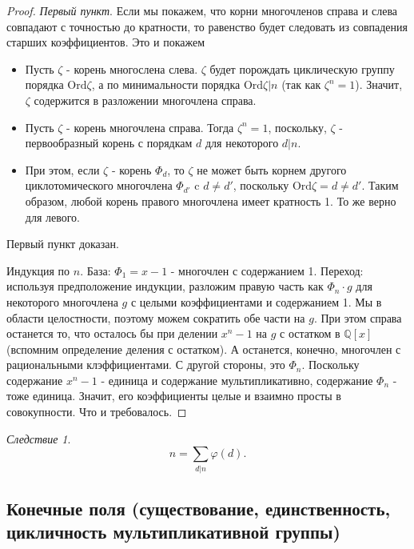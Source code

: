\documentclass[a4paper,100pt]{article}
\theoremstyle{indented}
\theoremstyle{definition}
\theoremstyle{remark}
\newtheorem{cons}{Следствие}
\begin{document}
\begin{proof}
    \textit{Первый пункт}. Если мы покажем, что корни многочленов справа и слева совпадают с точностью до кратности, то равенство будет следовать из совпадения старших коэффициентов. Это и покажем\ 

    \begin{itemize}
        \item Пусть $\zeta$ - корень многослена слева. $\zeta$ будет порождать циклическую группу порядка $\text{Ord} \zeta$, а по минимальности порядка $\text{Ord}\zeta\vert n$ (так как $\zeta^n=1$). Значит, $\zeta$ содержится в разложении многочлена справа.
        \item Пусть $\zeta$ - корень многочлена справа. Тогда $\zeta^n=1$, поскольку, $\zeta$ - первообразный корень с порядкам $d$ для некоторого $d\vert n$.
        \item При этом, если $\zeta$ - корень $\Phi_d$, то $\zeta$ не может быть корнем другого циклотомического многочлена $\Phi_{d'}$ c $d\neq d'$, поскольку $\text{Ord}\zeta=d\neq d'$. Таким образом, любой корень правого многочлена имеет кратность 1. То же верно для левого.
    \end{itemize}
    
    Первый пункт доказан.\ 

    Индукция по $n$. База: $\Phi_1=x-1$ - многочлен с содержанием 1. Переход: используя предположение индукции, разложим правую часть как $\Phi_n\cdot g$ для некоторого многочлена $g$ с целыми коэффициентами и содержанием 1. Мы в области целостности, поэтому можем сократить обе части на $g$. При этом справа останется то, что осталось бы при делении $x^n-1$ на $g$ с остатком в $\mathbb{Q}[x]$ (вспомним определение деления с остатком). А останется, конечно, многочлен с рациональными клэффициентами. С другой стороны, это $\Phi_n$. Поскольку содержание $x^n-1$ - единица и содержание мультипликативно, содержание $\Phi_n$ - тоже единица. Значит, его коэффициенты целые и взаимно просты в совокупности. \hypertarget{t5}{Что и требовалось}.
\end{proof}

\begin{cons}
    \[
        n=\sum_{d\vert n}\varphi(d).
    \]
\end{cons}

\resetall

\subsection{Конечные поля (существование, единственность, цикличность мультипликативной группы)}
\end{document}
